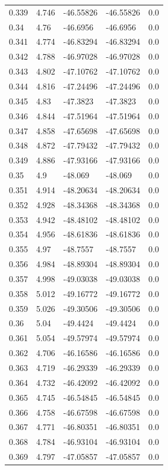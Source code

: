 \begin{tabular}{lllll}
0.339 & 4.746 & -46.55826 & -46.55826 & 0.0 \\
0.34 & 4.76 & -46.6956 & -46.6956 & 0.0 \\
0.341 & 4.774 & -46.83294 & -46.83294 & 0.0 \\
0.342 & 4.788 & -46.97028 & -46.97028 & 0.0 \\
0.343 & 4.802 & -47.10762 & -47.10762 & 0.0 \\
0.344 & 4.816 & -47.24496 & -47.24496 & 0.0 \\
0.345 & 4.83 & -47.3823 & -47.3823 & 0.0 \\
0.346 & 4.844 & -47.51964 & -47.51964 & 0.0 \\
0.347 & 4.858 & -47.65698 & -47.65698 & 0.0 \\
0.348 & 4.872 & -47.79432 & -47.79432 & 0.0 \\
0.349 & 4.886 & -47.93166 & -47.93166 & 0.0 \\
0.35 & 4.9 & -48.069 & -48.069 & 0.0 \\
0.351 & 4.914 & -48.20634 & -48.20634 & 0.0 \\
0.352 & 4.928 & -48.34368 & -48.34368 & 0.0 \\
0.353 & 4.942 & -48.48102 & -48.48102 & 0.0 \\
0.354 & 4.956 & -48.61836 & -48.61836 & 0.0 \\
0.355 & 4.97 & -48.7557 & -48.7557 & 0.0 \\
0.356 & 4.984 & -48.89304 & -48.89304 & 0.0 \\
0.357 & 4.998 & -49.03038 & -49.03038 & 0.0 \\
0.358 & 5.012 & -49.16772 & -49.16772 & 0.0 \\
0.359 & 5.026 & -49.30506 & -49.30506 & 0.0 \\
0.36 & 5.04 & -49.4424 & -49.4424 & 0.0 \\
0.361 & 5.054 & -49.57974 & -49.57974 & 0.0 \\
0.362 & 4.706 & -46.16586 & -46.16586 & 0.0 \\
0.363 & 4.719 & -46.29339 & -46.29339 & 0.0 \\
0.364 & 4.732 & -46.42092 & -46.42092 & 0.0 \\
0.365 & 4.745 & -46.54845 & -46.54845 & 0.0 \\
0.366 & 4.758 & -46.67598 & -46.67598 & 0.0 \\
0.367 & 4.771 & -46.80351 & -46.80351 & 0.0 \\
0.368 & 4.784 & -46.93104 & -46.93104 & 0.0 \\
0.369 & 4.797 & -47.05857 & -47.05857 & 0.0 \\

\end{tabular}
